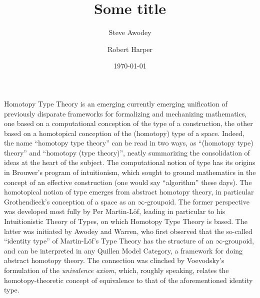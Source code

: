 \documentclass[11pt]{article}
\theoremstyle{remark}
\theoremstyle{definition}
\begin{document}

\title{Some title}
\author{Steve Awodey \and Robert Harper}
\date{\today}

\maketitle


Homotopy Type Theory is an emerging currently emerging unification of previously disparate frameworks for formalizing
and mechanizing mathematics, one based on a computational conception of the type of a construction, the other based on a
homotopical conception of the (homotopy) type of a space.  Indeed, the name ``homotopy type theory'' can be read in two
ways, as ``(homotopy type) theory'' and ``homotopy (type theory)'', neatly summarizing the consolidation of ideas at the
heart of the subject.  The computational notion of type has its origins in Brouwer's program of intuitionism, which
sought to ground mathematics in the concept of an effective construction (one would say ``algorithm'' these days).  The
homotopical notion of type emerges from abstract homotopy theory, in particular Grothendieck's conception of a space as
an $\infty$-groupoid.  The former perspective was developed most fully by Per Martin-L\"{o}f, leading in particular to
his Intuitionistic Theory of Types, on which Homotopy Type Theory is based.  The latter was initiated by Awodey and
Warren, who first observed that the so-called ``identity type'' of Martin-L\"{o}f's Type Theory has the structure of an
$\infty$-groupoid, and can be interpreted in any Quillen Model Category, a framework for doing abstract homotopy theory.
The connection was clinched by Voevodsky's formulation of the \emph{univalence axiom}, which, roughly speaking, relates
the homotopy-theoretic concept of equivalence to that of the aforementioned identity type.
\end{document}
